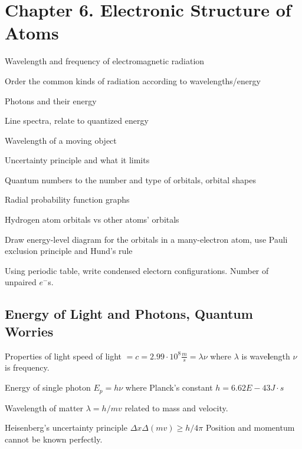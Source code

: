 \section{Chapter 6. Electronic Structure of Atoms}

\secttoc

{\footnotesize
\begin{multicols}{3}
\begin{compactenum}
    \item Wavelength and frequency of electromagnetic radiation
    \item Order the common kinds of radiation according to wavelengths/energy
    \item Photons and their energy
    \item Line spectra, relate to quantized energy
    \item Wavelength of a moving object
    \item Uncertainty principle and what it limits
    \item Quantum numbers to the number and type of orbitals, orbital shapes
    \item Radial probability function graphs
    \item Hydrogen atom orbitals vs other atoms' orbitals
    \item Draw energy-level diagram for the orbitals in a many-electron
        atom, use Pauli exclusion principle and Hund's rule
    \item Using periodic table, write condensed electorn configurations. Number of unpaired $e^-$s.
\end{compactenum}
\end{multicols}
}

\begin{mdframed}
\subsection{Energy of Light and Photons, Quantum Worries}
\begin{multicols}{2}
\begin{compactdesc}
\item[Properties of light] speed of light $= c = 2.99 \cdot 10^8 \frac{m}{s} = \lambda \nu$
    where $\lambda$ is wave\textbf{l}ength $\nu$ is frequency.
\item[Energy of single photon] $E_p = h \nu$ where Planck's constant
    $h = 6.62E-43 J \cdot s$
\item[Wavelength of matter] $\lambda = h / mv$ related to mass and velocity.
\item[Heisenberg's uncertainty principle] $\Delta x \Delta (mv) \geq h / 4\pi$
    Position and momentum cannot be known perfectly.
\end{compactdesc}
\end{multicols}
\end{mdframed}




